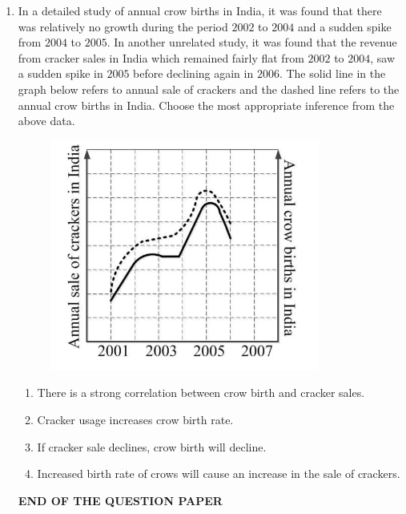 \documentclass[journal]{IEEEtran}
\begin{document}
\begin{enumerate}
    \item In a detailed study of annual crow births in India, it was found that there was relatively no growth during the period $2002$ to $2004$ and a sudden spike from $2004$ to $2005$. In another unrelated study, it was found that the revenue from cracker sales in India which remained fairly flat from $2002$ to $2004$, saw a sudden spike in $2005$ before declining again in $2006$. The solid line in the graph below refers to annual sale of crackers and the dashed line refers to the annual crow births in India. Choose the most appropriate inference from the above data.
    \begin{figure}[H]
        \centering
        \includegraphics[width=0.5\columnwidth]{figs/01.png}
        \caption*{}
        \label{fig:q10}
    \end{figure}
    
    \hfill{}
    \begin{enumerate}
        \item There is a strong correlation between crow birth and cracker sales.
        \item Cracker usage increases crow birth rate.
        \item If cracker sale declines, crow birth will decline.
        \item Increased birth rate of crows will cause an increase in the sale of crackers.
    \end{enumerate}
\textbf{END OF THE QUESTION PAPER}
\end{enumerate}
\vspace{1cm}
\end{document}
